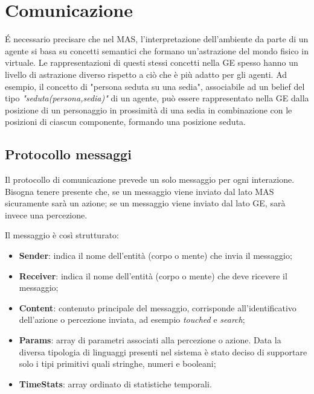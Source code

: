 \section{Comunicazione}

\'E necessario precisare che nel MAS, l'interpretazione dell'ambiente da parte di un agente si basa su concetti semantici che formano un'astrazione del mondo fisico in virtuale.
Le rappresentazioni di questi stessi concetti nella GE spesso hanno un livello di astrazione diverso rispetto a ciò che è più adatto per gli agenti.
Ad esempio, il concetto di "persona seduta su una sedia", associabile ad un belief del tipo \textit{"seduta(persona,sedia)"} di un agente,
può essere rappresentato nella GE dalla posizione di un personaggio in prossimità di una sedia in combinazione con le posizioni di ciascun componente, formando una posizione seduta.

\medskip

\subsection{Protocollo messaggi} \label{protocollo_messaggi}

Il protocollo di comunicazione prevede un solo messaggio per ogni interazione.
Bisogna tenere presente che, se un messaggio viene inviato dal lato MAS sicuramente sarà un azione; se un messaggio viene inviato dal lato GE, sarà
invece una percezione.

\medskip

Il messaggio è così strutturato:
\begin{itemize}
   \item \textbf{Sender}: indica il nome dell'entità (corpo o mente) che invia il messaggio;
   \item \textbf{Receiver}: indica il nome dell'entità (corpo o mente) che deve ricevere il messaggio;
   \item \textbf{Content}: contenuto principale del messaggio, corrisponde all'identificativo dell'azione o percezione inviata, ad esempio \textit{touched} e \textit{search};
   \item \textbf{Params}: array di parametri associati alla percezione o azione. Data la diversa tipologia di linguaggi presenti nel sistema è stato deciso di supportare solo i tipi primitivi quali stringhe, numeri e booleani;
   \item \textbf{TimeStats}: array ordinato di statistiche temporali.
\end{itemize}

